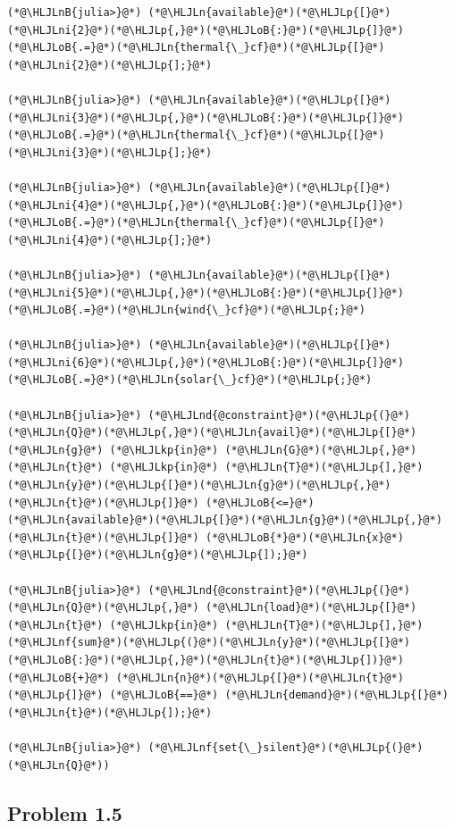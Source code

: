 \documentclass[12pt,a4paper]{article}
\newcommand{\HLJLkp}[1]{\textcolor[RGB]{148,91,176}{\textbf{#1}}}
\newcommand{\HLJLn}[1]{#1}
\newcommand{\HLJLnd}[1]{\textcolor[RGB]{214,102,97}{#1}}
\newcommand{\HLJLnf}[1]{\textcolor[RGB]{66,102,213}{#1}}
\newcommand{\HLJLnB}[1]{\textcolor[RGB]{59,151,46}{#1}}
\newcommand{\HLJLni}[1]{\textcolor[RGB]{59,151,46}{#1}}
\newcommand{\HLJLoB}[1]{\textcolor[RGB]{102,102,102}{\textbf{#1}}}
\newcommand{\HLJLp}[1]{#1}
\begin{document}
\begin{lstlisting}
(*@\HLJLnB{julia>}@*) (*@\HLJLn{available}@*)(*@\HLJLp{[}@*)(*@\HLJLni{2}@*)(*@\HLJLp{,}@*)(*@\HLJLoB{:}@*)(*@\HLJLp{]}@*) (*@\HLJLoB{.=}@*)(*@\HLJLn{thermal{\_}cf}@*)(*@\HLJLp{[}@*)(*@\HLJLni{2}@*)(*@\HLJLp{];}@*)

(*@\HLJLnB{julia>}@*) (*@\HLJLn{available}@*)(*@\HLJLp{[}@*)(*@\HLJLni{3}@*)(*@\HLJLp{,}@*)(*@\HLJLoB{:}@*)(*@\HLJLp{]}@*) (*@\HLJLoB{.=}@*)(*@\HLJLn{thermal{\_}cf}@*)(*@\HLJLp{[}@*)(*@\HLJLni{3}@*)(*@\HLJLp{];}@*)

(*@\HLJLnB{julia>}@*) (*@\HLJLn{available}@*)(*@\HLJLp{[}@*)(*@\HLJLni{4}@*)(*@\HLJLp{,}@*)(*@\HLJLoB{:}@*)(*@\HLJLp{]}@*) (*@\HLJLoB{.=}@*)(*@\HLJLn{thermal{\_}cf}@*)(*@\HLJLp{[}@*)(*@\HLJLni{4}@*)(*@\HLJLp{];}@*)

(*@\HLJLnB{julia>}@*) (*@\HLJLn{available}@*)(*@\HLJLp{[}@*)(*@\HLJLni{5}@*)(*@\HLJLp{,}@*)(*@\HLJLoB{:}@*)(*@\HLJLp{]}@*) (*@\HLJLoB{.=}@*)(*@\HLJLn{wind{\_}cf}@*)(*@\HLJLp{;}@*)

(*@\HLJLnB{julia>}@*) (*@\HLJLn{available}@*)(*@\HLJLp{[}@*)(*@\HLJLni{6}@*)(*@\HLJLp{,}@*)(*@\HLJLoB{:}@*)(*@\HLJLp{]}@*) (*@\HLJLoB{.=}@*)(*@\HLJLn{solar{\_}cf}@*)(*@\HLJLp{;}@*)

(*@\HLJLnB{julia>}@*) (*@\HLJLnd{@constraint}@*)(*@\HLJLp{(}@*)(*@\HLJLn{Q}@*)(*@\HLJLp{,}@*)(*@\HLJLn{avail}@*)(*@\HLJLp{[}@*)(*@\HLJLn{g}@*) (*@\HLJLkp{in}@*) (*@\HLJLn{G}@*)(*@\HLJLp{,}@*) (*@\HLJLn{t}@*) (*@\HLJLkp{in}@*) (*@\HLJLn{T}@*)(*@\HLJLp{],}@*)(*@\HLJLn{y}@*)(*@\HLJLp{[}@*)(*@\HLJLn{g}@*)(*@\HLJLp{,}@*)(*@\HLJLn{t}@*)(*@\HLJLp{]}@*) (*@\HLJLoB{<=}@*) (*@\HLJLn{available}@*)(*@\HLJLp{[}@*)(*@\HLJLn{g}@*)(*@\HLJLp{,}@*)(*@\HLJLn{t}@*)(*@\HLJLp{]}@*) (*@\HLJLoB{*}@*)(*@\HLJLn{x}@*)(*@\HLJLp{[}@*)(*@\HLJLn{g}@*)(*@\HLJLp{]);}@*)

(*@\HLJLnB{julia>}@*) (*@\HLJLnd{@constraint}@*)(*@\HLJLp{(}@*)(*@\HLJLn{Q}@*)(*@\HLJLp{,}@*) (*@\HLJLn{load}@*)(*@\HLJLp{[}@*)(*@\HLJLn{t}@*) (*@\HLJLkp{in}@*) (*@\HLJLn{T}@*)(*@\HLJLp{],}@*) (*@\HLJLnf{sum}@*)(*@\HLJLp{(}@*)(*@\HLJLn{y}@*)(*@\HLJLp{[}@*)(*@\HLJLoB{:}@*)(*@\HLJLp{,}@*)(*@\HLJLn{t}@*)(*@\HLJLp{])}@*)(*@\HLJLoB{+}@*) (*@\HLJLn{n}@*)(*@\HLJLp{[}@*)(*@\HLJLn{t}@*)(*@\HLJLp{]}@*) (*@\HLJLoB{==}@*) (*@\HLJLn{demand}@*)(*@\HLJLp{[}@*)(*@\HLJLn{t}@*)(*@\HLJLp{]);}@*)

(*@\HLJLnB{julia>}@*) (*@\HLJLnf{set{\_}silent}@*)(*@\HLJLp{(}@*)(*@\HLJLn{Q}@*))
\end{lstlisting}

\subsection{Problem 1.5}
\end{document}
